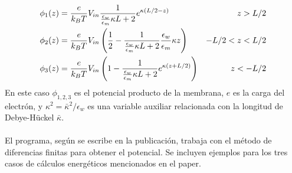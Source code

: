 \documentclass[12pt, notitlepage]{article}
\begin{document}
\begin{align}
\phi_1(z) &= \frac{e}{k_BT}V_{in}\frac{1}{\frac{\epsilon_w}{\epsilon_m}\kappa L + 2}e^{\kappa(L/2 - z)} &z>L/2\\
\phi_2(z) &= \frac{e}{k_BT}V_{in}\left(\frac{1}{2}-\frac{1}{\frac{\epsilon_w}{\epsilon_m}\kappa L + 2}\frac{\epsilon_w}{\epsilon_m}\kappa z\right) &-L/2 < z < L/2\\
\arraycolsep=0.3in\def\arraystretch{2}
\phi_3(z) &= \frac{e}{k_BT}V_{in}\left(1 - \frac{1}{\frac{\epsilon_w}{\epsilon_m}\kappa L + 2}e^{\kappa(z+ L/2)}\right)&z<-L/2
\end{align}
En este caso $\phi_{1,2,3}$ es el potencial producto de la membrana, $e$ es la carga del electrón, y $\kappa^2=\bar{\kappa}^2/\epsilon_w$ es una variable auxiliar relacionada con la longitud de Debye-Hückel $\bar{\kappa}$.\\\\
El programa, según se escribe en la publicación, trabaja con el método de diferencias finitas para obtener el potencial. Se incluyen ejemplos para los tres casos de cálculos energéticos mencionados en el paper.
\end{document}
